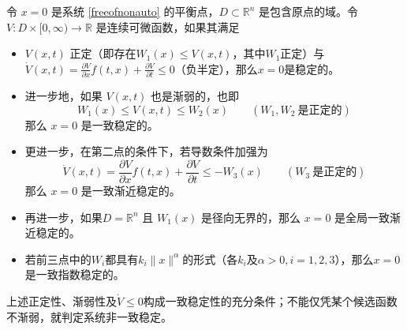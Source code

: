\begin{theorem}[非自治系统的Lyapunov稳定性定理]\label{lyapunov_nonauto}
  令 $x = 0$ 是系统 \eqref{freeofnonauto} 的平衡点，$D \subset
  \mathbb{R}^n$ 是包含原点的域。令 $V: D \times [0, \infty) \rightarrow \mathbb{R}$
  是连续可微函数，如果其满足
  \begin{itemize}[leftmargin=1em]
    \item $V (x, t)$ 正定（即存在$W_1 (x) \leq V (x, t)$，其中$W_1$正定）与
    $\dot{V} (x, t) = \frac{\partial V}{\partial x} f (t, x) + \frac{\partial V}{\partial t} \leq 0$（负半定），那么$x=0$是稳定的。
    
    \item 进一步地，如果 $V (x, t)$ 也是渐弱的，也即
    \[ W_1 (x) \leq V (x, t) \leq W_2 (x) \qquad (W_1, W_2 \ \text{是正定的}) \]
    那么 $x = 0$ 是一致稳定的。

    \item 更进一步，在第二点的条件下，若导数条件加强为
    \[ \dot{V} (x, t) = \frac{\partial V}{\partial x} f (t, x) + \frac{\partial
       V}{\partial t} \leq - W_3 (x) \qquad (W_3 \ \text{是正定的}) \]
    那么 $x = 0$ 是一致渐近稳定的。
    
    \item 再进一步，如果$D=\mathbb{R}^n$ 且 $W_1 (x)$ 是径向无界的，那么 $x = 0$ 是全局一致渐近稳定的。

    \item 若前三点中的$W_i$都具有$k_i \| x \|^\alpha $的形式（各$k_i$及$\alpha> 0,i=1,2,3$），那么$x = 0$ 是一致指数稳定的。
  \end{itemize}
\end{theorem}
\begin{note}
  上述正定性、渐弱性及$\dot V\le0$构成一致稳定性的充分条件；不能仅凭某个候选函数不渐弱，就判定系统非一致稳定。
\end{note}
